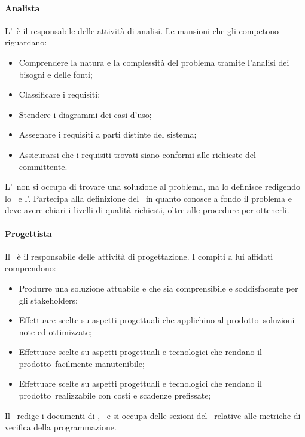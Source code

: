 \documentclass[../NormeProgetto.tex]{subfiles}
\begin{document}
			\paragraph{Analista}
			L'\analista\ è il responsabile delle attività di analisi. Le mansioni che gli competono riguardano:
			\begin{itemize}
			\item Comprendere la natura e la complessità del problema tramite l'analisi dei bisogni e delle fonti;
			\item Classificare i requisiti;
			\item Stendere i diagrammi dei casi d'uso;
			\item Assegnare i requisiti a parti distinte del sistema;
			\item Assicurarsi che i requisiti trovati siano conformi alle richieste del committente.
			\end{itemize}
			L'\analista\ non si occupa di trovare una soluzione al problema, ma lo definisce redigendo lo \studiodifattibilita\ e l'\analisideirequisiti. Partecipa alla definizione del \pianodiqualifica\ in quanto conosce a fondo il problema e deve avere chiari i livelli di qualità richiesti, oltre alle procedure per ottenerli. 
			\paragraph{Progettista}
			Il \progettista\ è il responsabile delle attività di progettazione. I compiti a lui affidati comprendono:
			\begin{itemize}
			\item Produrre una soluzione attuabile e che sia comprensibile e soddisfacente per gli stakeholders;
			\item Effettuare scelte su aspetti progettuali che applichino al prodotto\g\ soluzioni note ed ottimizzate;
			\item Effettuare scelte su aspetti progettuali e tecnologici che rendano il prodotto\g\ facilmente manutenibile;
			\item Effettuare scelte su aspetti progettuali e tecnologici che rendano il prodotto\g\ realizzabile con costi e scadenze prefissate;
			\end{itemize}
			Il \progettista\ redige i documenti di \specificatecnica, \ e si occupa delle sezioni del \pianodiqualifica\ relative alle metriche di verifica della programmazione.
\end{document}
